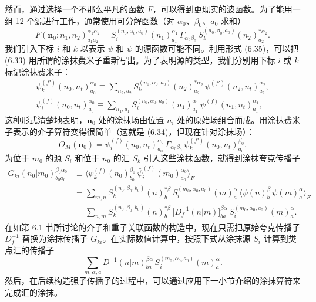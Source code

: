 然而，通过选择一个不那么平凡的函数 $F$，可以得到更现实的波函数。为了能用一组 12 个源进行工作，通常使用可分解函数（对 $\alpha_0$、$\beta_0$、$a_0$ 求和）
\begin{equation}
  F(\mathbf{n}_0; n_1, n_2)^{\alpha_1\alpha_2}_{a_1a_2}
  = S_i^{(n_0,\alpha_0,a_0)}(n_1)^{\alpha_1}_{a_1}\,
    \Gamma_{\alpha_0\beta_0}\,
    S_k^{(n_0,\beta_0,a_0)}(n_2)^{*\alpha_2}_{a_2} .
\end{equation}
我们引入下标 $i$ 和 $k$ 以表示 $\psi$ 和 $\bar\psi$ 的源函数可能不同。利用形式 (6.35)，可以把 (6.33) 用所谓的涂抹费米子重新写出。为了表明源的类型，我们分别用下标 $i$ 或 $k$ 标记涂抹费米子：
\begin{equation}
  \begin{gathered}
    \psi_k^{(f')}(n_0, n_t)^{\alpha_0}_{a_0}
    \equiv \sum_{n_2,a_2} S_k^{(n_0,\alpha_0,a_0)}(n_2)^{*\alpha_2}_{a_2}\,
      \psi^{(f')}(n_2, n_t)^{\alpha_2}_{a_2} , \\
    \psi_i^{(f)}(n_0, n_t)^{\alpha_0}_{a_0}
    \equiv \sum_{n_1,a_1} S_i^{(n_0,\alpha_0,a_0)}(n_1)^{\alpha_1}_{a_1}\,
      \psi^{(f)}(n_1, n_t)^{\alpha_1}_{a_1} ,
  \end{gathered}
\end{equation}
这种形式清楚地表明，$\mathbf{n}_0$ 处的涂抹场由位置 $n_i$ 处的原始场组合而成。用涂抹费米子表示的介子算符变得很简单（这就是 (6.34)，但现在针对涂抹场）：
\begin{equation}
  O_M(\mathbf{n}_0) = \psi_i^{(f)}(n_0, n_t)^{\alpha_0}_{a_0}\,
    \Gamma_{\alpha_0\beta_0}\,
    \psi_k^{(f')}(n_0, n_t)^{\beta_0}_{a_0} .
\end{equation}
为位于 $m_0$ 的源 $S_i$ 和位于 $n_0$ 的汇 $S_k$ 引入这些涂抹函数，就得到涂抹夸克传播子
\begin{equation}
  \begin{split}
    G_{ki}(n_0|m_0)^{\beta_0\alpha_0}_{b_0a_0}
    &\equiv \big\langle \psi_k^{(f)}(n_0)^{\beta_0}_{b_0}\,
       \bar\psi_i^{(f)}(m_0)^{\alpha_0}_{a_0} \big\rangle_F \\
    &= \sum_{m,n} S_k^{(n_0,\beta_0,b_0)}(n)^{*\beta}_{b}\,
       S_i^{(m_0,\alpha_0,a_0)}(m)^{\alpha}_{a}\,
       \big\langle \psi(n)^{\beta}_{b}\, \bar\psi(m)^{\alpha}_{a} \big\rangle_F \\
    &= \sum_{n,m} S_k^{(n_0,\beta_0,b_0)}(n)^{*\beta}_{b}\,
       \big[D_f^{-1}(n|m)\big]^{\beta\alpha}_{ba}\,
       S_i^{(m_0,\alpha_0,a_0)}(m)^{\alpha}_{a} .
  \end{split}
\end{equation}
在如第 6.1 节所讨论的介子和重子关联函数的构造中，现在只需把原始夸克传播子 $D_f^{-1}$ 替换为涂抹传播子 $G_{ki}$。在实际数值计算中，按照下式从涂抹源 $S_i$ 计算到类点汇的传播子
\begin{equation}
  \sum_{m,\alpha,a} D^{-1}(n|m)^{\beta\alpha}_{ba}\,
    S_i^{(m_0,\alpha_0,a_0)}(m)^{\alpha}_{a} .
\end{equation}
然后，在后续构造强子传播子的过程中，可以通过应用下一小节介绍的涂抹算符来完成汇的涂抹。

